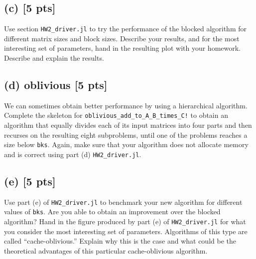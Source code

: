 \documentclass[twoside,10pt]{article}
\begin{document}
\subsection*{(c) [5 pts]}
Use section \texttt{HW2\_driver.jl} to try the performance of the blocked algorithm for different matrix sizes and block sizes. 
Describe your results, and for the most interesting set of parameters, hand in the resulting plot with your homework.
Describe and explain the results.

\subsection*{(d) oblivious [5 pts]}
We can sometimes obtain better performance by using a hierarchical algorithm. 
Complete the skeleton for \texttt{oblivious\_add\_to\_A\_B\_times\_C!} to obtain an algorithm that equally divides each of its input matrices into four parts and then recurses on the resulting eight subproblems, until one of the problems reaches a size below \texttt{bks}.
Again, make sure that your algorithm does not allocate memory and is correct using part (d) \texttt{HW2\_driver.jl}.

\subsection*{(e) [5 pts]} Use part (e) of \texttt{HW2\_driver.jl} to benchmark your new algorithm for different values of \texttt{bks}. 
Are you able to obtain an improvement over the blocked algorithm? 
Hand in the figure produced by part (e) of \texttt{HW2\_driver.jl} for what you consider the most interesting set of parameters.
Algorithms of this type are called ``cache-oblivious.'' 
Explain why this is the case and what could be the theoretical advantages of this particular cache-oblivious algorithm.
\end{document}
